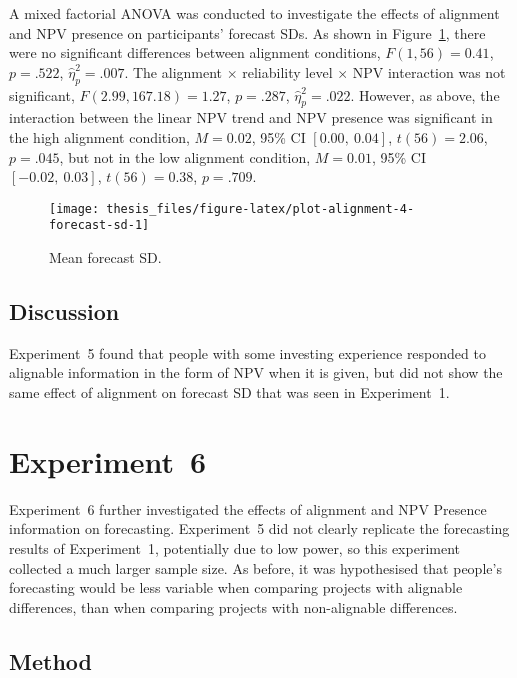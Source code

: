 \documentclass[a4paper, nobind]{templates/ociamthesis}
\theoremstyle{definition}
\theoremstyle{definition}
\theoremstyle{definition}
\theoremstyle{definition}
\theoremstyle{remark}
\begin{document}
A mixed factorial ANOVA was conducted to investigate the effects of alignment
and NPV presence on participants' forecast SDs. As shown in
Figure~\ref{fig:plot-alignment-4-forecast-sd}, there were no significant
differences between alignment conditions,
\(F(1, 56) = 0.41\), \(p = .522\), \(\hat{\eta}^2_p = .007\). The alignment \(\times\)
reliability level \(\times\) NPV interaction was not significant,
\(F(2.99, 167.18) = 1.27\), \(p = .287\), \(\hat{\eta}^2_p = .022\).
However, as above, the interaction between the linear NPV trend and NPV presence
was significant in the high alignment condition,
\(M = 0.02\), 95\% CI \([0.00,~0.04]\), \(t(56) = 2.06\), \(p = .045\), but not in the
low alignment condition, \(M = 0.01\), 95\% CI \([-0.02,~0.03]\), \(t(56) = 0.38\), \(p = .709\).



\begin{figure}
\texttt{[image: thesis\_files/figure-latex/plot-alignment-4-forecast-sd-1]} \caption{Mean forecast SD.}\label{fig:plot-alignment-4-forecast-sd}
\end{figure}

\subsection{Discussion}

Experiment~5 found that people with some investing experience responded to
alignable information in the form of NPV when it is given, but did not show the
same effect of alignment on forecast SD that was seen in Experiment~1.

\section{Experiment~6}

Experiment~6 further investigated the effects of alignment and NPV Presence
information on forecasting. Experiment~5 did not clearly replicate the
forecasting results of Experiment~1, potentially due to low power, so this
experiment collected a much larger sample size. As before, it was hypothesised
that people's forecasting would be less variable when comparing projects with
alignable differences, than when comparing projects with non-alignable
differences.

\subsection{Method}
\end{document}
